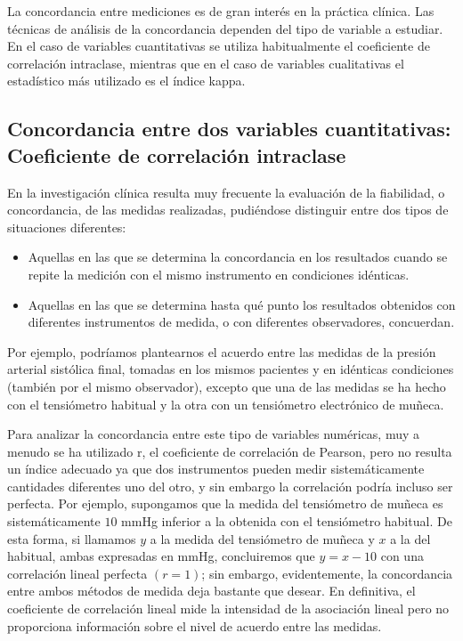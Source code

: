 La concordancia entre mediciones es de gran interés en la práctica clínica. Las técnicas de análisis de la concordancia dependen del tipo de
variable a estudiar. En el caso de variables cuantitativas se utiliza habitualmente el coeficiente de correlación intraclase, mientras que
en el caso de variables cualitativas el estadístico más utilizado es el índice kappa.



\subsection{Concordancia entre dos variables cuantitativas: Coeficiente de correlación intraclase}
En la investigación clínica resulta muy frecuente la evaluación de la fiabilidad, o concordancia, de las medidas realizadas, pudiéndose
distinguir entre dos tipos de situaciones diferentes:
\begin{itemize}
\item Aquellas en las que se determina la concordancia en los resultados cuando se repite la medición con el mismo instrumento en
condiciones idénticas.
\item Aquellas en las que se determina hasta qué punto los resultados obtenidos con diferentes instrumentos de medida, o con diferentes
observadores, concuerdan.
\end{itemize}
 
Por ejemplo, podríamos plantearnos el acuerdo entre las medidas de la presión arterial sistólica final, tomadas en los mismos pacientes y en
idénticas condiciones (también por el mismo observador), excepto que una de las medidas se ha hecho con el tensiómetro habitual y la otra
con un tensiómetro electrónico de muñeca.

Para analizar la concordancia entre este tipo de variables numéricas, muy a menudo se ha utilizado r, el coeficiente de correlación de
Pearson, pero no resulta un índice adecuado ya que dos instrumentos pueden medir sistemáticamente cantidades diferentes uno del otro, y sin
embargo la correlación podría incluso ser perfecta. Por ejemplo, supongamos que la medida del tensiómetro de muñeca es sistemáticamente $10$
 mmHg inferior a la obtenida con el tensiómetro habitual. De esta forma, si llamamos $y$ a la medida del tensiómetro de muñeca y $x$ a la
del habitual, ambas expresadas en mmHg, concluiremos que $y=x-10$ con una correlación lineal perfecta $(r=1)$; sin embargo,
evidentemente, la concordancia entre ambos métodos de medida deja bastante que desear. En definitiva, el coeficiente de correlación lineal
mide la intensidad de la asociación lineal pero no proporciona información sobre el nivel de acuerdo entre las medidas.

